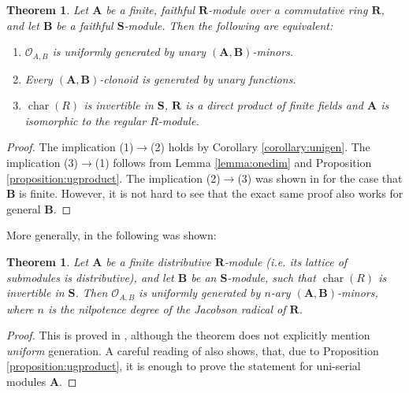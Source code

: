 \documentclass[11pt]{amsart}
\theoremstyle{plain}
\newtheorem{theorem}[thm]{Theorem}
\newtheorem{lemma}[thm]{Lemma}
\theoremstyle{definition}
\newcommand{\alg}[1]{\mathbf{#1}}
\newcommand{\clone}[1]{\mathcal{#1}}
\newcommand{\clonoid}[1]{\mathcal{#1}}
\newcommand{\clodO}{\clonoid{O}}
\newcommand{\algA}{\alg{A}}
\newcommand{\algB}{\alg{B}}
\newcommand{\algM}{\alg{M}}
\newcommand{\algR}{\alg{R}}
\newcommand{\algS}{\alg{S}}
\newcommand{\cloO}{\clone{O}}
\DeclareMathOperator{\chars}{char}
\begin{document}
\begin{theorem} \label{theorem:unarymodules}
Let $\algA$ be a finite, faithful $\algR$-module over a commutative ring $\algR$, and let $\algB$ be a faithful $\algS$-module. Then the following are equivalent:
\begin{enumerate}
    \item $\clodO_{A,B}$ is uniformly generated by unary $(\algA,\algB)$-minors.
    \item Every $(\algA,\algB)$-clonoid is generated by unary functions.
    \item $\chars(R)$ is invertible in $\algS$, $\algR$ is a direct product of finite fields and $\algA$ is isomorphic to the regular $R$-module.
\end{enumerate}
\end{theorem}


\begin{proof}
The implication (1)$\to$(2) holds by Corollary \ref{corollary:unigen}. The implication (3)$\to$(1) follows from Lemma \ref{lemma:onedim} and Proposition \ref{proposition:ugproduct}. The implication (2)$\to$(3) was shown in \cite[Theorem 1.5.]{MW-clonoidsmodules} for the case that $\algB$ is finite. However, it is not hard to see that the exact same proof also works for general $\algB$.
\end{proof}

More generally, in \cite{MW-clonoidsmodules} the following was shown:

\begin{theorem} \label{theorem:distributive}
Let $\algA$ be a finite distributive $\algR$-module (i.e. its lattice of submodules is distributive), and let $\algB$ be an $\algS$-module, such that $\chars(R)$ is invertible in $\algS$. Then $\cloO_{A,B}$ is uniformly generated by  $n$-ary $(\algA,\algB)$-minors, where $n$ is the nilpotence degree of the Jacobson radical of $\algR$.
\end{theorem}

\begin{proof}
This is proved in \cite[Theorem 1.4.]{MW-clonoidsmodules}, although the theorem does not explicitly mention \emph{uniform} generation. A careful reading of \cite{MW-clonoidsmodules} also shows, that, due to Proposition \ref{proposition:ugproduct}, it is enough to prove the statement for uni-serial modules $\algA$.
\end{proof}



\end{document}
